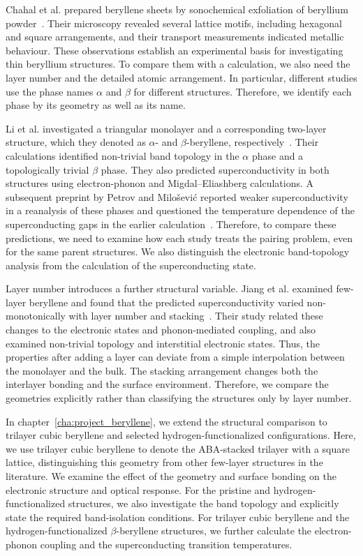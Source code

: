 Chahal et al. prepared beryllene sheets by sonochemical exfoliation of beryllium powder~\cite{chahal2023beryllene}.
Their microscopy revealed several lattice motifs, including hexagonal and square arrangements, and their transport measurements indicated metallic behaviour.
These observations establish an experimental basis for investigating thin beryllium structures.
To compare them with a calculation, we also need the layer number and the detailed atomic arrangement.
In particular, different studies use the phase names $\alpha$ and $\beta$ for different structures.
Therefore, we identify each phase by its geometry as well as its name.

Li et al. investigated a triangular monolayer and a corresponding two-layer structure, which they denoted as $\alpha$- and $\beta$-beryllene, respectively~\cite{li2023coexistence}.
Their calculations identified non-trivial band topology in the $\alpha$ phase and a topologically trivial $\beta$ phase.
They also predicted superconductivity in both structures using electron-phonon and Migdal--Eliashberg calculations.
A subsequent preprint by Petrov and Milo\v{s}evi\'{c} reported weaker superconductivity in a reanalysis of these phases and questioned the temperature dependence of the superconducting gaps in the earlier calculation~\cite{petrov2024comment}.
Therefore, to compare these predictions, we need to examine how each study treats the pairing problem, even for the same parent structures.
We also distinguish the electronic band-topology analysis from the calculation of the superconducting state.

Layer number introduces a further structural variable.
Jiang et al. examined few-layer beryllene and found that the predicted superconductivity varied non-monotonically with layer number and stacking~\cite{jiang2025nonmonotonic}.
Their study related these changes to the electronic states and phonon-mediated coupling, and also examined non-trivial topology and interstitial electronic states.
Thus, the properties after adding a layer can deviate from a simple interpolation between the monolayer and the bulk.
The stacking arrangement changes both the interlayer bonding and the surface environment.
Therefore, we compare the geometries explicitly rather than classifying the structures only by layer number.

In chapter~\ref{cha:project_beryllene}, we extend the structural comparison to trilayer cubic beryllene and selected hydrogen-functionalized configurations.
Here, we use trilayer cubic beryllene to denote the ABA-stacked trilayer with a square lattice, distinguishing this geometry from other few-layer structures in the literature.
We examine the effect of the geometry and surface bonding on the electronic structure and optical response.
For the pristine and hydrogen-functionalized structures, we also investigate the band topology and explicitly state the required band-isolation conditions.
For trilayer cubic beryllene and the hydrogen-functionalized $\beta$-beryllene structures, we further calculate the electron-phonon coupling and the superconducting transition temperatures.

